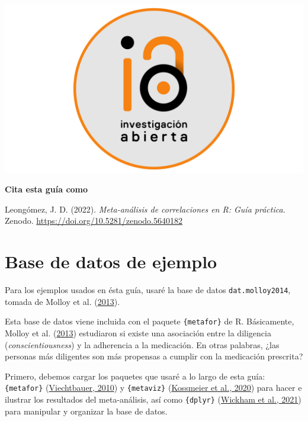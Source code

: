 \documentclass[
  bookmarksnumbered]{article}
\begin{document}
\href{https://www.youtube.com/c/InvestigaciónAbierta}{\includegraphics{images/Logo-IA-Rectangulo.pdf}}

\par
\endgroup
\vfill

\textbf{Cita esta guía como } \hrulefill 

\begin{hangparas}{.25in}{1}
Leongómez, J. D. (2022). \textit{Meta-análisis de correlaciones en R: Guía práctica.} Zenodo. \url{https://doi.org/10.5281/zenodo.5640182}
\end{hangparas}

\newpage
{\hypersetup{hidelinks}
 \setcounter{tocdepth}{5}
 \tableofcontents
}
\newpage

\hypertarget{base-de-datos-de-ejemplo}{%
\section{Base de datos de ejemplo}\label{base-de-datos-de-ejemplo}}

Para los ejemplos usados en ésta guía, usaré la base de datos \texttt{dat.molloy2014}, tomada de Molloy et al. (\protect\hyperlink{ref-molloy2013}{2013}).

Esta base de datos viene incluida con el paquete \texttt{\{metafor\}} de R. Básicamente, Molloy et al. (\protect\hyperlink{ref-molloy2013}{2013}) estudiaron si existe una asociación entre la diligencia (\emph{conscientiousness}) y la adherencia a la medicación. En otras palabras, ¿las personas más diligentes son más propensas a cumplir con la medicación prescrita?

Primero, debemos cargar los paquetes que usaré a lo largo de esta guía: \texttt{\{metafor\}} (\protect\hyperlink{ref-viechtbauer2010}{Viechtbauer, 2010}) y \texttt{\{metaviz\}} (\protect\hyperlink{ref-KossmeierMetaviz}{Kossmeier et al., 2020}) para hacer e ilustrar los resultados del meta-análisis, así como \texttt{\{dplyr\}} (\protect\hyperlink{ref-WickhamDplyr2021}{Wickham et al., 2021}) para manipular y organizar la base de datos.
\end{document}
